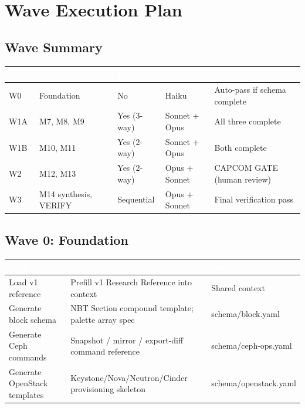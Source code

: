\documentclass[11pt,letterpaper]{article}
\newcommand{\tableheader}[1]{\textbf{\sffamily\textcolor{white}{#1}}}
\begin{document}
\section{Wave Execution Plan}

\subsection{Wave Summary}

\begin{center}
\begin{tabularx}{\textwidth}{L{1.5cm}L{3cm}L{2.5cm}L{2.5cm}X}
\toprule
{}
\tableheader{Wave} & \tableheader{Components} & \tableheader{Parallel} & \tableheader{Model} & \tableheader{Gate} \\
\midrule
W0 & Foundation & No & Haiku & Auto-pass if schema complete \\
W1A & M7, M8, M9 & Yes (3-way) & Sonnet + Opus & All three complete \\
W1B & M10, M11 & Yes (2-way) & Sonnet + Opus & Both complete \\
W2 & M12, M13 & Yes (2-way) & Opus + Sonnet & CAPCOM GATE (human review) \\
W3 & M14 synthesis, VERIFY & Sequential & Opus + Sonnet & Final verification pass \\
\bottomrule
\end{tabularx}
\end{center}

\subsection{Wave 0: Foundation}

\begin{center}
\begin{tabularx}{\textwidth}{L{2.5cm}XL{2cm}}
\toprule
{}
\tableheader{Task} & \tableheader{Action} & \tableheader{Output} \\
\midrule
Load v1 reference & Prefill v1 Research Reference into context & Shared context \\
Generate block schema & NBT Section compound template; palette array spec & schema/block.yaml \\
Generate Ceph commands & Snapshot / mirror / export-diff command reference & schema/ceph-ops.yaml \\
Generate OpenStack templates & Keystone/Nova/Neutron/Cinder provisioning skeleton & schema/openstack.yaml \\
\bottomrule
\end{tabularx}
\end{center}
\end{document}
